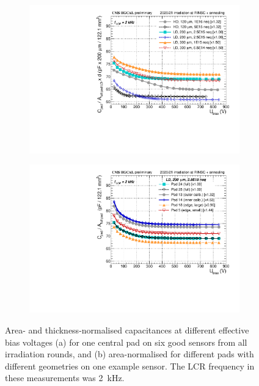 \begin{figure}
	\captionsetup[subfigure]{aboveskip=-1pt,belowskip=-1pt}
	\centering
	\begin{subfigure}[b]{0.49\textwidth}
		\includegraphics[width=0.999\textwidth]{plots/channel_cv/channel_CV_sensors_sensors.pdf}
		\subcaption{
		}
		\label{plot:pad_CV_sensor}
	\end{subfigure}
	\hfill
	\begin{subfigure}[b]{0.49\textwidth}
		\includegraphics[width=0.999\textwidth]{plots/channel_cv/channel_CV_sensors_channels.pdf}
		\subcaption{
		}
		\label{plot:pad_CV_channels}
	\end{subfigure}
	\caption{
		Area- and thickness-normalised capacitances at different effective bias voltages (a) for one central pad on six good sensors from all irradiation rounds, and (b) area-normalised for different pads with different geometries on one example sensor.
		The LCR frequency in these measurements was \SI{2}{\kilo\hertz}.
	}
\end{figure}

